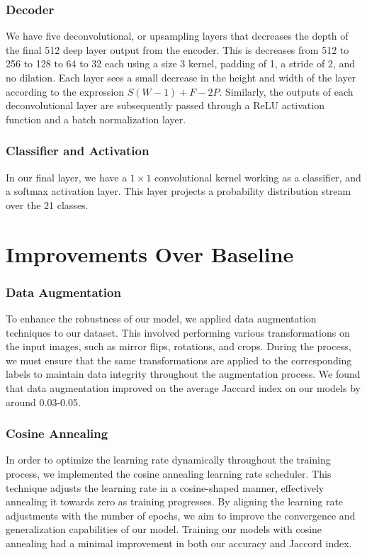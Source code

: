 \subsubsection*{Decoder}
We have five deconvolutional, or upsampling layers that decreases the depth of the final 512 deep layer output from the encoder. This is decreases from 512 to 256 to 128 to 64 to 32 each using a size 3 kernel, padding of 1, a stride of 2, and no dilation. Each layer sees a small decrease in the height and width of the layer according to the expression $S(W - 1) + F - 2P$. Similarly, the outputs of each deconvolutional layer are subsequently passed through a ReLU activation function and a batch normalization layer.

\subsubsection*{Classifier and Activation}
In our final layer, we have a $1 \times 1$ convolutional kernel working as a classifier, and a softmax activation layer. This layer projects a probability distribution stream over the 21 classes.

\section*{Improvements Over Baseline}

\subsubsection*{Data Augmentation}
To enhance the robustness of our model, we applied data augmentation techniques to our dataset. This involved performing various transformations on the input images, such as mirror flips, rotations, and crops. During the process, we must ensure that the same transformations are applied to the corresponding labels to maintain data integrity throughout the augmentation process. We found that data augmentation improved on the average Jaccard index on our models by around 0.03-0.05.

\subsubsection*{Cosine Annealing}
In order to optimize the learning rate dynamically throughout the training process, we implemented the cosine annealing learning rate scheduler. This technique adjusts the learning rate in a cosine-shaped manner, effectively annealing it towards zero as training progresses. By aligning the learning rate adjustments with the number of epochs, we aim to improve the convergence and generalization capabilities of our model. Training our models with cosine annealing had a minimal improvement in both our accuracy and Jaccord index.

